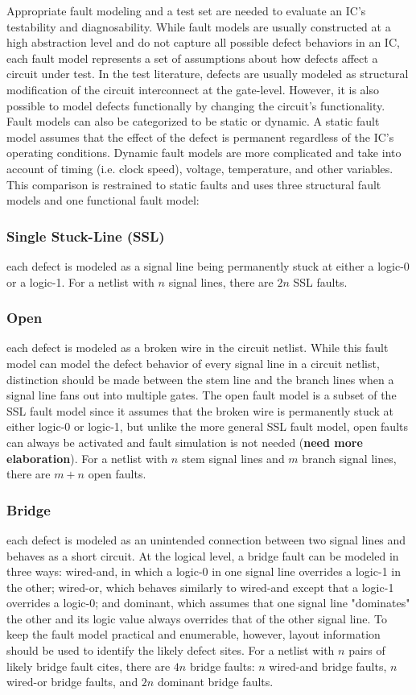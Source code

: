 \documentclass[journal]{IEEEtran}
\begin{document}
Appropriate fault modeling and a test set are needed to evaluate an IC's testability and diagnosability. While fault models are usually constructed at a high abstraction level and do not capture all possible defect behaviors in an IC, each fault model represents a set of assumptions about how defects affect a circuit under test. In the test literature, defects are usually modeled as structural modification of the circuit interconnect at the gate-level. However, it is also possible to model defects functionally by changing the circuit's functionality. Fault models can also be categorized to be static or dynamic. A static fault model assumes that the effect of the defect is permanent regardless of the IC's operating conditions. Dynamic fault models are more complicated and take into account of timing (i.e. clock speed), voltage, temperature, and other variables. This comparison is restrained to static faults and uses three structural fault models and one functional fault model: 

\subsubsection{Single Stuck-Line (SSL)} each defect is modeled as a signal line being permanently stuck at either a logic-0 or a logic-1. For a netlist with $n$ signal lines, there are $2n$ SSL faults.

\subsubsection{Open} each defect is modeled as a broken wire in the circuit netlist. While this fault model can model the defect behavior of every signal line in a circuit netlist, distinction should be made between the stem line and the branch lines when a signal line fans out into multiple gates. The open fault model is a subset of the SSL fault model since it assumes that the broken wire is permanently stuck at either logic-0 or logic-1, but unlike the more general SSL fault model, open faults can always be activated and fault simulation is not needed (\textbf{need more elaboration}). For a netlist with $n$ stem signal lines and $m$ branch signal lines, there are $m+n$ open faults.

\subsubsection{Bridge} each defect is modeled as an unintended connection between two signal lines and behaves as a short circuit. At the logical level, a bridge fault can be modeled in three ways: wired-and, in which a logic-0 in one signal line overrides a logic-1 in the other; wired-or, which behaves similarly to wired-and except that a logic-1 overrides a logic-0; and dominant, which assumes that one signal line "dominates" the other and its logic value always overrides that of the other signal line. To keep the fault model practical and enumerable, however, layout information should be used to identify the likely defect sites. For a netlist with $n$ pairs of likely bridge fault cites, there are $4n$ bridge faults: $n$ wired-and bridge faults, $n$ wired-or bridge faults, and $2n$  dominant bridge faults.
\end{document}
